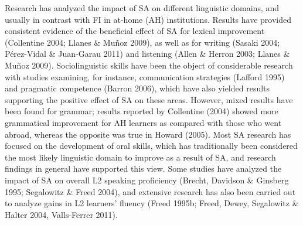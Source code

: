\documentclass[12pt]{article}
\newenvironment{styleStandard}{\setlength\leftskip{0cm}\setlength\rightskip{0cm plus 1fil}\setlength\parindent{0cm}\setlength\parfillskip{0pt plus 1fil}\setlength\parskip{0in plus 1pt}\writerlistparindent\writerlistleftskip\leavevmode\normalfont\normalsize\writerlistlabel\ignorespaces}{\unskip\vspace{0.111in plus 0.0111in}\par}
\newcommand\writerlistleftskip{}
\newcommand\writerlistparindent{}
\newcommand\writerlistlabel{}
\begin{document}
\begin{styleStandard}
Research has analyzed the impact of SA on different linguistic domains, and usually in contrast with FI in at-home (AH) institutions. Results have provided consistent evidence of the beneficial effect of SA for lexical improvement (Collentine 2004; Llanes \& Muñoz 2009), as well as for writing (Sasaki 2004; Pérez-Vidal \& Juan-Garau 2011) and listening (Allen \& Herron 2003; Llanes \& Muñoz 2009). Sociolinguistic skills have been the object of considerable research with studies examining, for instance, communication strategies (Lafford 1995) and pragmatic competence (Barron 2006), which have also yielded results supporting the positive effect of SA on these areas. However, mixed results have been found for grammar; results reported by Collentine (2004) showed more grammatical improvement for AH learners as compared with those who went abroad, whereas the opposite was true in Howard (2005). Most SA research has focused on the development of oral skills, which has traditionally been considered the most likely linguistic domain to improve as a result of SA, and research findings in general have supported this view. Some studies have analyzed the impact of SA on overall L2 speaking proficiency (Brecht, Davidson \& Ginsberg 1995; Segalowitz \& Freed 2004), and extensive research has also been carried out to analyze gains in L2 learners’ fluency (Freed 1995b; Freed, Dewey, Segalowitz \& Halter 2004, Valls-Ferrer 2011). 
\end{styleStandard}
\end{document}
